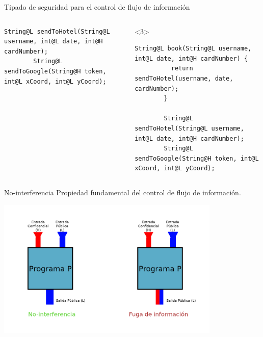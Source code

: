 \documentclass[aspectratio=169,10pt]{beamer}
\begin{document}
\begin{frame}[fragile]{Tipado de seguridad para el control de flujo de información}
\begin{columns}[T,onlytextwidth]
\begin{onlyenv}
\begin{lstlisting}[escapechar=?]
        String@L sendToHotel(String@L username, int@L date, int@H cardNumber);
        String@L sendToGoogle(String@H token, int@L xCoord, int@L yCoord);
      \end{lstlisting}
    \end{onlyenv}
		\begin{onlyenv}<3>
      \begin{lstlisting}[escapechar=?]
        String@L book(String@L username, int@L date, int@H cardNumber) {
          return sendToHotel(username, date, cardNumber);
        }

        String@L sendToHotel(String@L username, int@L date, int@H cardNumber);
        String@L sendToGoogle(String@H token, int@L xCoord, int@L yCoord);
      \end{lstlisting}
    \end{onlyenv}
  \end{columns}

\end{frame}

\begin{frame}[fragile]{No-interferencia}
  Propiedad fundamental del control de flujo de información.
	\begin{center}
		\includegraphics[width=0.8\textwidth]{images/noninterference.png}
	\end{center}
\end{frame}
\end{document}

